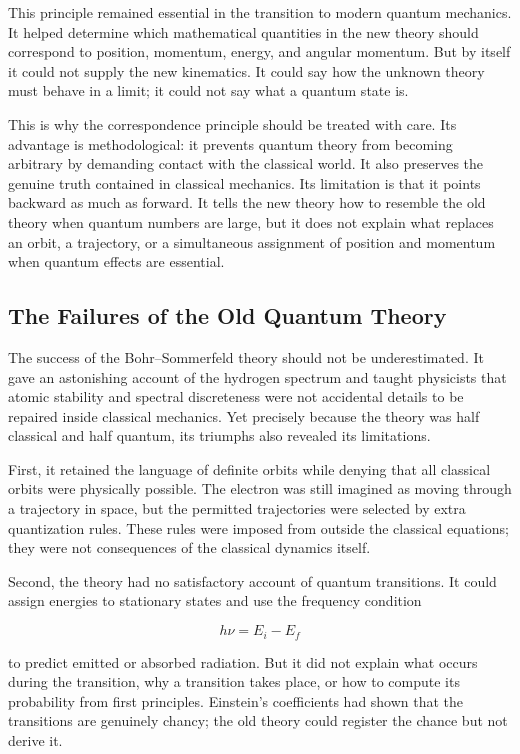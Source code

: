 This principle remained essential in the transition to modern quantum mechanics. It helped determine which mathematical quantities in the new theory should correspond to position, momentum, energy, and angular momentum. But by itself it could not supply the new kinematics. It could say how the unknown theory must behave in a limit; it could not say what a quantum state is.

This is why the correspondence principle should be treated with care. Its advantage is methodological: it prevents quantum theory from becoming arbitrary by demanding contact with the classical world. It also preserves the genuine truth contained in classical mechanics. Its limitation is that it points backward as much as forward. It tells the new theory how to resemble the old theory when quantum numbers are large, but it does not explain what replaces an orbit, a trajectory, or a simultaneous assignment of position and momentum when quantum effects are essential.

\subsection{The Failures of the Old Quantum Theory}
The success of the Bohr--Sommerfeld theory should not be underestimated. It gave an astonishing account of the hydrogen spectrum and taught physicists that atomic stability and spectral discreteness were not accidental details to be repaired inside classical mechanics. Yet precisely because the theory was half classical and half quantum, its triumphs also revealed its limitations.

First, it retained the language of definite orbits while denying that all classical orbits were physically possible. The electron was still imagined as moving through a trajectory in space, but the permitted trajectories were selected by extra quantization rules. These rules were imposed from outside the classical equations; they were not consequences of the classical dynamics itself.

Second, the theory had no satisfactory account of quantum transitions. It could assign energies to stationary states and use the frequency condition
\begin{linenomath}
    \begin{equation}
        h\nu=E_i-E_f
    \end{equation}
\end{linenomath}
to predict emitted or absorbed radiation. But it did not explain what occurs during the transition, why a transition takes place, or how to compute its probability from first principles. Einstein's coefficients had shown that the transitions are genuinely chancy; the old theory could register the chance but not derive it.

